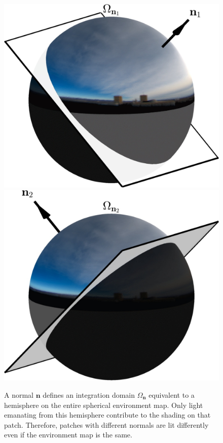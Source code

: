 \begin{figure}
    \centering
    \includegraphics[width=.495\linewidth]{./figures/diagramFig/diagram1.jpg}
    \includegraphics[width=.495\linewidth]{./figures/diagramFig/diagram2.jpg}
    \caption[Hemispheres defined by surface normals]{A normal $\mathbf{n}$ defines an integration domain $\Omega_{\mathbf{n}}$ equivalent to a hemisphere on the entire spherical environment map. Only light emanating from this hemisphere contribute to the shading on that patch. Therefore, patches with different normals are lit differently even if the environment map is the same.}
    \label{fig:normal-diagram}
\end{figure}

